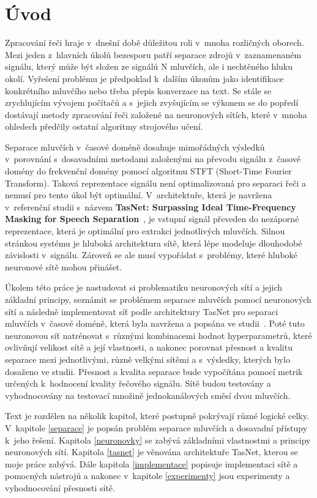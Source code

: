 \chapter{Úvod}
Zpracování řeči hraje v~dnešní době důležitou roli v~mnoha rozličných oborech. Mezi jeden z~hlavních úkolů bezesporu patří separace zdrojů v~zaznamenaném signálu, který může být složen ze signálů N mluvčích, ale i nechtěného hluku okolí. Vyřešení problému je předpoklad k~dalším úkonům jako identifikace konkrétního mluvčího nebo třeba přepis konverzace na text. Se stále se zrychlujícím vývojem počítačů a s~jejich zvyšujícím se výkonem se do popředí dostávají metody zpracování řeči založené na neuronových sítích, které v~mnoha ohledech předčily ostatní algoritmy strojového učení.

Separace mluvčích v~časové doméně dosahuje mimořádných výsledků v~porovnání s~dosavadními metodami  založenými na převodu signálu z~časové domény do frekvenční domény pomocí algoritmu STFT (Short-Time Fourier Transform). Taková reprezentace signálu není optimalizovaná pro separaci řeči a nemusí pro tento úkol být optimální. V~architektuře, která je navržena v~referenční studii s~názvem \textbf{TasNet: Surpassing Ideal Time-Frequency Masking for Speech Separation}~\cite{luo2018convtasnet}, je vstupní signál převeden do nezáporné reprezentace, která je optimální pro extrakci jednotlivých mluvčích. Silnou stránkou systému je hluboká architektura sítě, která lépe modeluje dlouhodobé závislosti v~signálu. Zároveň se ale musí vypořádat s~problémy, které hluboké neuronové sítě mohou přinášet.

Úkolem této práce je nastudovat si problematiku neuronových sítí a jejich základní principy, seznámit se problémem separace mluvčích pomocí neuronových sítí a následně implementovat síť podle architektury TasNet pro separaci mluvčích v~časové doméně, která byla navržena a popsána ve studii~\cite{luo2018convtasnet}. Poté tuto neuronovou síť natrénovat s~různými kombinacemi hodnot hyperparametrů, které ovlivňují velikost sítě a její vlastnosti, a nakonec porovnat přesnost a kvalitu separace mezi jednotlivými, různě velkými sítěmi a s~výsledky, kterých bylo dosaženo ve studii. Přesnost a kvalita separace bude vypočítána pomocí metrik určených k~hodnocení kvality řečového signálu. Sítě budou testovány a vyhodnocovány na testovací množině jednokanálových směsí dvou mluvčích.

Text je rozdělen na několik kapitol, které postupně pokrývají různé logické celky. V~kapitole \ref{separace} je popsán problém separace mluvčích a dosavadní přístupy k~jeho řešení. Kapitola \ref{neuronovky} se zabývá základními vlastnostmi a principy neuronových sítí. Kapitola \ref{tasnet} je věnována architektuře TasNet, kterou se moje práce zabývá. Dále kapitola \ref{implementace} popisuje implementaci sítě a pomocných nástrojů a nakonec v~kapitole \ref{experimenty} jsou experimenty a vyhodnocování přesnosti sítě.



